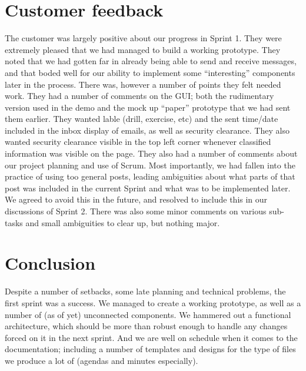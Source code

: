 \section{Customer feedback}
The customer was largely positive about our progress in Sprint 1. They were extremely pleased that we had managed to build a working prototype. They noted that we had gotten far in already being able to send and receive messages, and that boded well for our ability to implement some “interesting” components later in the process.
\newline
\newline
There was, however a number of points they felt needed work. They had a number of comments on the GUI; both the rudimentary version used in the demo and the mock up “paper” prototype that we had sent them earlier. They wanted lable (drill, exercise, etc) and the sent time/date included in the inbox display of emails, as well as security clearance. They also wanted security clearance visible in the top left corner whenever classified information was visible on the page. 
\newline
\newline
They also had a number of comments about our project planning and use of Scrum. Most importantly, we had fallen into the practice of using too general posts, leading ambiguities about what parts of that post was included in the current Sprint and what was to be implemented later. We agreed to avoid this in the future, and resolved to include this in our discussions of Sprint 2. There was also some minor comments on various sub-tasks and small ambiguities to clear up, but nothing major.

\section{Conclusion}
Despite a number of setbacks, some late planning and technical problems, the first sprint was a success. We managed to create a working prototype, as well as a number of (as of yet) unconnected components. We hammered out a functional architecture, which should be more than robust enough to handle any changes forced on it in the next sprint. And we are well on schedule when it comes to the documentation; including a number of templates and designs for the type of files we produce a lot of (agendas and minutes especially). 

